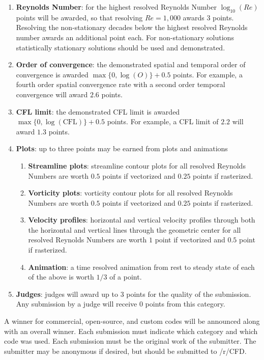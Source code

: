 \documentclass[]{article}
\begin{document}
\begin{enumerate}
\item \textbf{Reynolds Number}: for the highest resolved Reynolds Number $\log_{10}(Re)$ points will be awarded, so that resolving $Re = 1,000$ awards $3$ points.
Resolving the non-stationary decades below the highest resolved Reynolds number awards an additional point each.
For non-stationary solutions statistically stationary solutions should be used and demonstrated.

\item \textbf{Order of convergence}: the demonstrated spatial and temporal order of convergence is awarded $\max\{0,\log(O)\}+0.5$ points.  
For example, a fourth order spatial convergence rate with a second order temporal convergence will award $2.6$ points.

\item \textbf{CFL limit}: the demonstrated CFL limit is awarded $\max\{0,\log(\text{CFL})\}+0.5$ points.  
For example, a CFL limit of $2.2$ will award $1.3$ points.

\item \textbf{Plots}: up to three points may be earned from plots and animations
	
	\begin{enumerate}
		\item \textbf{Streamline plots}: streamline contour plots for all resolved Reynolds Numbers are worth $0.5$ points if vectorized and $0.25$ points if rasterized.
		
		\item \textbf{Vorticity plots}: vorticity contour plots for all resolved Reynolds Numbers are worth $0.5$ points if vectorized and $0.25$ points if rasterized.
		
		\item \textbf{Velocity profiles}: horizontal and vertical velocity profiles through both the horizontal and vertical lines through the geometric center for all resolved Reynolds Numbers are worth $1$ point if vectorized and $0.5$ point if rasterized.
		
		\item \textbf{Animation}: a time resolved animation from rest to steady state of each of the above is worth $1/3$ of a point.
	\end{enumerate}

		
\item \textbf{Judges}: judges will award up to $3$ points for the quality of the submission.
Any submission by a judge will receive $0$ points from this category.

\end{enumerate}

A winner for commercial, open-source, and custom codes will be announced along with an overall winner.
Each submission must indicate which category and which code was used.
Each submission must be the original work of the submitter.
The submitter may be anonymous if desired, but should be submitted to /r/CFD.
\end{document}
